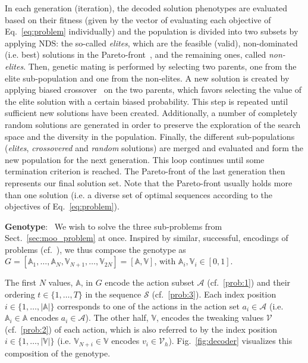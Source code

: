 \documentclass[runningheads, envcountsame, a4paper]{llncs}
\newcommand{\actions}{\mathcal{A}}
\newcommand{\action}{a}
\newcommand{\actionspart}{\mathbb{A}}
\newcommand{\Values}{\mathcal{V}}
\newcommand{\Value}{v}
\newcommand{\valuespart}{\mathbb{V}}
\newcommand{\sequence}{\mathcal{S}}
\newcommand{\genotype}{G}
\begin{document}
In each generation (iteration), the decoded solution phenotypes are evaluated based on their fitness (given by the vector of evaluating each objective of Eq.~\ref{eq:problem} individually) and the population is divided into two subsets by applying NDS: the so-called \emph{elites}, which are the feasible (valid), non-dominated (i.e. best) solutions in the Pareto-front~\cite{eibenIntroductionEvolutionaryComputing2015}, and the remaining ones, called \emph{non-elites}.
Then, genetic mating is performed by selecting two parents, one from the elite sub-population and one from the non-elites. A new solution is created by applying biased crossover~\cite{goncalvesBiasedRandomkeyGenetic2011} on the two parents, which favors selecting the value of the elite solution with a certain biased probability. This step is repeated until sufficient new solutions have been created. Additionally, a number of completely random solutions are generated in order to preserve the exploration of the search space and the diversity in the population. Finally, the different sub-populations (\emph{elites}, \emph{crossovered} and \emph{random} solutions) are merged and evaluated and form the new population for the next generation. This loop continues until some termination criterion is reached. The Pareto-front of the last generation then represents our final solution set. Note that the Pareto-front usually holds more than one solution (i.e. a diverse set of optimal sequences according to the objectives of Eq.~\ref{eq:problem}).

\textbf{Genotype}: \,
We wish to solve the three sub-problems from Sect.~\ref{sec:moo_problem} at once.
Inspired by similar, successful, encodings of problems (cf.~\cite{goncalvesBiasedRandomkeyGenetic2011}), we thus compose the genotype as $\genotype = [\actionspart_1,\dots,\actionspart_N, \allowbreak \valuespart_{N+1},\dots,\valuespart_{2N}] \allowbreak = [\actionspart, \valuespart]$, with $\actionspart_i, \valuespart_i \in [0,1]$.

The first $N$ values, $\actionspart$, in $G$ encode the action subset $\actions$ (cf.~\ref{prob:1}) and their ordering $t \in \{1,\dots,T\}$ in the sequence $\sequence$ (cf.~\ref{prob:3}). Each index position $i \in \{1,\dots,|\actionspart|\}$ corresponds to one of the actions in the action set $\action_i \in \actions$ (i.e. $\actionspart_{i} \in \actionspart$ encodes $\action_i \in \actions$).
The other half, $\valuespart$, encodes the tweaking values $\Values$ (cf.~\ref{prob:2}) of each action, which is also referred to by the index position $i \in \{1,\dots,|\valuespart|\}$ (i.e. $\valuespart_{N+i} \in \valuespart$ encodes $\Value_i \in \Values_h$).
Fig.~\ref{fig:decoder} visualizes this composition of the genotype.
\end{document}
